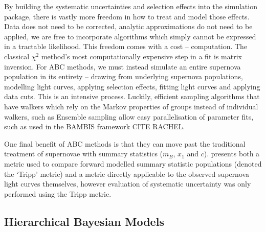 \documentclass[a4paper,fleqn,usenatbib]{mnras}
\newcommand{\red}{\color{red}}
\begin{document}
By building the systematic uncertainties and selection effects into the simulation package, there is vastly more freedom in how to treat and model those effects. Data does not need to be corrected, analytic approximations do not need to be applied, we are free to incorporate algorithms which simply cannot be expressed in a tractable likelihood. This freedom comes with a cost -- computation. The classical $\chi^2$ method's most computationally expensive step in a fit is matrix inversion. For ABC methods, we must instead simulate an entire supernova population in its entirety -- drawing from underlying supernova populations, modelling light curves, applying selection effects, fitting light curves and applying data cuts. This is an intensive process. Luckily, efficient sampling algorithms that have walkers which rely on the Markov properties of groups instead of individual walkers, such as Ensemble sampling \citep{Foreman-Mackey2013} allow easy parallelisation of parameter fits, such as used in the BAMBIS framework {\red CITE RACHEL}.

One final benefit of ABC methods is that they can move past the traditional treatment of supernovae with summary statistics ($m_B$, $x_1$ and $c$). \citet{Jennings2016} presents both a metric used to compare forward modelled summary statistic populations (denoted the `Tripp' metric) and a metric directly applicable to the observed supernova light curves themselves, however evaluation of systematic uncertainty was only performed using the Tripp metric.

\subsection{Hierarchical Bayesian Models}
\end{document}
